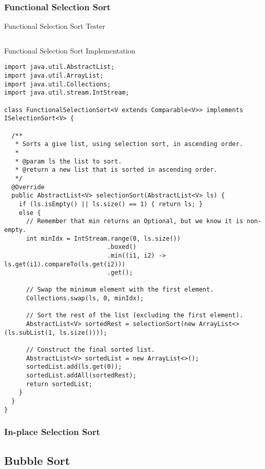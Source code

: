 \subsubsection*{Functional Selection Sort}
\begin{cl}{Functional Selection Sort Tester}
\begin{lstlisting}[language=MyJava]

\end{lstlisting}
\end{cl}
\begin{cl}{Functional Selection Sort Implementation}
\begin{lstlisting}[language=MyJava]
import java.util.AbstractList;
import java.util.ArrayList;
import java.util.Collections;
import java.util.stream.IntStream;

class FunctionalSelectionSort<V extends Comparable<V>> implements ISelectionSort<V> {

  /**
   * Sorts a give list, using selection sort, in ascending order. 
   *
   * @param ls the list to sort.
   * @return a new list that is sorted in ascending order.
   */
  @Override
  public AbstractList<V> selectionSort(AbstractList<V> ls) {
    if (ls.isEmpty() || ls.size() == 1) { return ls; }
    else {
      // Remember that min returns an Optional, but we know it is non-empty.
      int minIdx = IntStream.range(0, ls.size())
                            .boxed()
                            .min((i1, i2) -> ls.get(i1).compareTo(ls.get(i2)))
                            .get();

      // Swap the minimum element with the first element.
      Collections.swap(ls, 0, minIdx);

      // Sort the rest of the list (excluding the first element).
      AbstractList<V> sortedRest = selectionSort(new ArrayList<>(ls.subList(1, ls.size())));

      // Construct the final sorted list.
      AbstractList<V> sortedList = new ArrayList<>();
      sortedList.add(ls.get(0));
      sortedList.addAll(sortedRest);
      return sortedList;
    }
  }
}
\end{lstlisting}
\end{cl}
\subsubsection*{In-place Selection Sort}

\subsection{Bubble Sort}

